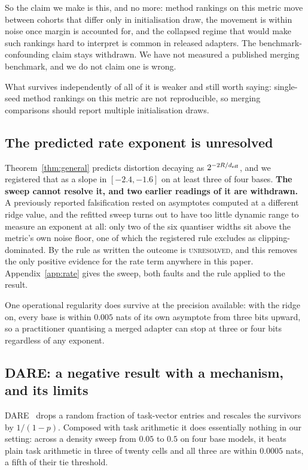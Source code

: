 So the claim we make is this, and no more: method rankings on this metric
move between cohorts that differ only in initialisation draw, the movement
is within noise once margin is accounted for, and the collapsed regime that
would make such rankings hard to interpret is common in released adapters.
The benchmark-confounding claim stays withdrawn. We have not measured a
published merging benchmark, and we do not claim one is wrong.

What survives independently of all of it is weaker and still worth saying:
single-seed method rankings on this metric are not reproducible, so merging
comparisons should report multiple initialisation draws.

\subsection{The predicted rate exponent is unresolved}
\label{subsec:w3}

Theorem~\ref{thm:general} predicts distortion decaying as $2^{-2R/d_{\mathrm{eff}}}$,
and we registered that as a slope in $[-2.4, -1.6]$ on at least three of
four bases. \textbf{The sweep cannot resolve it, and two earlier readings
of it are withdrawn.} A previously reported falsification rested on
asymptotes computed at a different ridge value, and the refitted sweep
turns out to have too little dynamic range to measure an exponent at all:
only two of the six quantiser widths sit above the metric's own noise
floor, one of which the registered rule excludes as clipping-dominated.
By the rule as written the outcome is \textsc{unresolved}, and this
removes the only positive evidence for the rate term anywhere in this
paper. Appendix~\ref{app:rate} gives the sweep, both faults and the rule
applied to the result.

One operational regularity does survive at the precision available: with
the ridge on, every base is within $0.005$ nats of its own asymptote from
three bits upward, so a practitioner quantising a merged adapter can stop
at three or four bits regardless of any exponent.

\subsection{DARE: a negative result with a mechanism, and its limits}
\label{subsec:dare}

DARE~\citep{yu2024dare} drops a random fraction of task-vector entries
and rescales the survivors by $1/(1-p)$. Composed with task arithmetic it
does essentially nothing in our setting: across a density sweep from
$0.05$ to $0.5$ on four base models, it beats plain task arithmetic in
three of twenty cells and all three are within $0.0005$ nats, a fifth of
their tie threshold.

